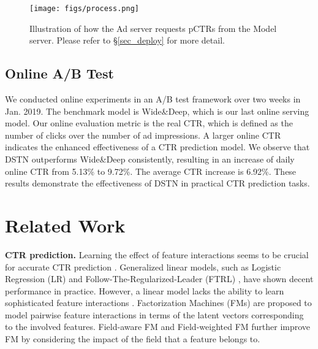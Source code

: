 \documentclass[sigconf]{acmart}
\begin{document}
\begin{figure}[!t]
\centering
\texttt{[image: figs/process.png]}
\vskip -8pt
\caption{Illustration of how the Ad server requests pCTRs from the Model server. Please refer to \S\ref{sec_deploy} for more detail.}
\vskip -11pt
\label{process}
\end{figure}

\subsection{Online A/B Test}
We conducted online experiments in an A/B test framework over two weeks in Jan. 2019. The benchmark model is Wide\&Deep, which is our last online serving model. Our online evaluation metric is the real CTR, which is defined as the number of clicks over the number of ad impressions. A larger online CTR indicates the enhanced effectiveness of a CTR prediction model.
We observe that DSTN outperforms Wide\&Deep consistently, resulting in an increase of daily online CTR from 5.13\% to 9.72\%. The average CTR increase is 6.92\%. These results demonstrate the effectiveness of DSTN in practical CTR prediction tasks.

\section{Related Work}
\textbf{CTR prediction.}
Learning the effect of feature interactions seems to be crucial for accurate CTR prediction \cite{rendle2010factorization}.
Generalized linear models, such as Logistic Regression (LR) \cite{richardson2007predicting} and Follow-The-Regularized-Leader (FTRL) \cite{mcmahan2013ad}, have shown decent performance in practice. However, a linear model lacks the ability to learn sophisticated feature interactions \cite{chapelle2015simple}. Factorization Machines (FMs) \cite{rendle2010factorization, blondel2016higher} are proposed to model pairwise feature interactions in terms of the latent vectors corresponding to the involved features. Field-aware FM \cite{juan2016field} and Field-weighted FM \cite{pan2018field} further improve FM by considering the impact of the field that a feature belongs to.
\end{document}
